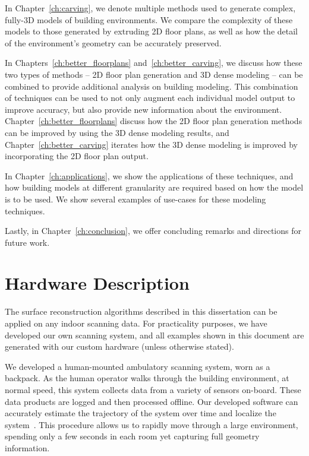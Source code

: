 \documentclass[12pt,onecolumn,oneside]{book}
\begin{document}
In Chapter~\ref{ch:carving}, we denote multiple methods used to generate complex, fully-3D models of building environments.  We compare the complexity of these models to those generated by extruding 2D floor plans, as well as how the detail of the environment's geometry can be accurately preserved.

In Chapters~\ref{ch:better_floorplans} and~\ref{ch:better_carving}, we discuss how these two types of methods -- 2D floor plan generation and 3D dense modeling -- can be combined to provide additional analysis on building modeling.  This combination of techniques can be used to not only augment each individual model output to improve accuracy, but also provide new information about the environment.  Chapter~\ref{ch:better_floorplans} discuss how the 2D floor plan generation methods can be improved by using the 3D dense modeling results, and Chapter~\ref{ch:better_carving} iterates how the 3D dense modeling is improved by incorporating the 2D floor plan output.

In Chapter~\ref{ch:applications}, we show the applications of these techniques, and how building models at different granularity are required based on how the model is to be used.  We show several examples of use-cases for these modeling techniques.

Lastly, in Chapter~\ref{ch:conclusion}, we offer concluding remarks and directions for future work.


\chapter{Hardware Description}
\label{ch:hardware}

The surface reconstruction algorithms described in this dissertation can be applied on any indoor scanning data.  For practicality purposes, we have developed our own scanning system, and all examples shown in this document are generated with our custom hardware (unless otherwise stated).

We developed a human-mounted ambulatory scanning system, worn as a backpack.  As the human operator walks through the building environment, at normal speed, this system collects data from a variety of sensors on-board.  These data products are logged and then processed offline.  Our developed software can accurately estimate the trajectory of the system over time and localize the system~\cite{NickJournal}.  This procedure allows us to rapidly move through a large environment, spending only a few seconds in each room yet capturing full geometry information.
\end{document}
